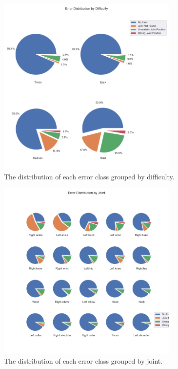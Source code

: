 \begin{figure}
  \centering
  \includegraphics[width=0.8\textwidth]{figures/Data/dist_joints/Error_Distribution_by_Difficulty.png}
  \caption[Error Distribution for each error class by difficulty]{The distribution of each error class grouped by difficulty.}
  \label{fig:jt_pie_diff}
\end{figure}

\begin{figure}
  \centering
  \includegraphics[width=0.8\textwidth]{figures/Data/dist_joints/Error_Distribution_by_Joint.png}
  \caption[Error Distribution for each error class by joint]{The distribution of each error class grouped by joint.}
  \label{fig:jt_pie_joint}
\end{figure}

